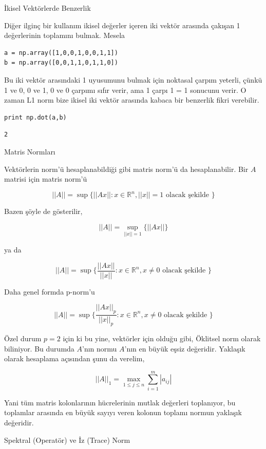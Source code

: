 \documentclass[12pt,fleqn]{article}\usepackage{../../common}
\begin{document}
İkisel Vektörlerde Benzerlik

Diğer ilginç bir kullanım ikisel değerler içeren iki vektör arasında
çakışan 1 değerlerinin toplamını bulmak. Mesela 

\begin{verbatim}
a = np.array([1,0,0,1,0,0,1,1])
b = np.array([0,0,1,1,0,1,1,0])
\end{verbatim}

Bu iki vektör arasındaki 1 uyusumunu bulmak için noktasal çarpım yeterli,
çünkü 1 ve 0, 0 ve 1, 0 ve 0 çarpımı sıfır verir, ama 1 çarpı 1 = 1
sonucunu verir. O zaman L1 norm bize ikisel iki vektör arasında kabaca bir
benzerlik fikri verebilir.

\begin{verbatim}
print np.dot(a,b)
\end{verbatim}

\begin{verbatim}
2
\end{verbatim}

Matris Normları

Vektörlerin norm'ü hesaplanabildiği gibi matris norm'ü da hesaplanabilir. Bir
$A$ matrisi için matris norm'ü

$$ || A || = \sup \{ ||Ax|| : x \in \mathbb{R}^n, ||x||=1 \textrm{ olacak şekilde } \} $$

Bazen şöyle de gösterilir,

$$  || A || = \sup_{||x||=1} \{ ||Ax|| \} $$

ya da

$$ || A || = \sup \{ \frac{||Ax||}{||x||} : x \in \mathbb{R}^n, x \ne 0 \textrm{ olacak şekilde } \} $$

Daha genel formda p-norm'u

$$ || A || = \sup
\bigg\{
\frac{||Ax||_p}{||x||_p} : x \in \mathbb{R}^n, x \ne 0 \textrm{ olacak şekilde }
\bigg\} $$

Özel durum $p=2$ için ki bu yine, vektörler için olduğu gibi, Öklitsel norm
olarak biliniyor. Bu durumda $A$'nın normu $A$'nın en büyük eşsiz
değeridir. Yaklaşık olarak hesaplama açısından şunu da verelim,

$$ ||A||_1 = \max_{1 \le j \le n} \sum_{i=1}^{m} |a_{ij}| $$

Yani tüm matris kolonlarının hücrelerinin mutlak değerleri toplanıyor, bu
toplamlar arasında en büyük sayıyı veren kolonun toplamı normun yaklaşık
değeridir.

Spektral (Operatör) ve İz (Trace) Norm
\end{document}
